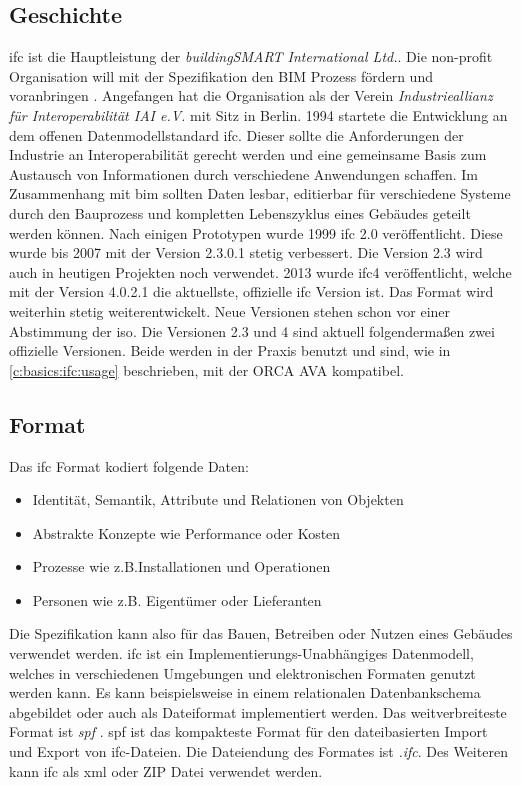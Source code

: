 \subsection{Geschichte}
\label{c:basics:ifc:history}
\ac{ifc} ist die Hauptleistung der \textit{buildingSMART International Ltd.}. Die non-profit Organisation will mit der Spezifikation den BIM Prozess fördern und voranbringen \citep[vgl.][]{BuildingSMART_IFC}.
Angefangen hat die Organisation als der Verein \textit{Industrieallianz für Interoperabilität IAI e.V.} mit Sitz in Berlin. 1994 startete die Entwicklung an dem offenen Datenmodellstandard \ac{ifc}. Dieser sollte die Anforderungen der Industrie an Interoperabilität gerecht werden und eine gemeinsame Basis zum Austausch von Informationen durch verschiedene Anwendungen schaffen. Im Zusammenhang mit \ac{bim} sollten Daten lesbar, editierbar für verschiedene Systeme durch den Bauprozess und kompletten Lebenszyklus eines Gebäudes geteilt werden können. \citep[vgl.][]{Laakso2012-oi} Nach einigen Prototypen wurde 1999 \ac{ifc} 2.0 veröffentlicht. Diese wurde bis 2007 mit der Version 2.3.0.1 stetig verbessert. Die Version 2.3 wird auch in heutigen Projekten noch verwendet. 2013 wurde \ac{ifc}4 veröffentlicht, welche mit der Version 4.0.2.1 die aktuellste, offizielle \ac{ifc} Version ist. Das Format wird weiterhin stetig weiterentwickelt. Neue Versionen stehen schon vor einer Abstimmung der \ac{iso}. \citep[vgl.][]{BuildingSMART_history_2022} Die Versionen 2.3 und 4 sind aktuell folgendermaßen zwei offizielle Versionen. Beide werden in der Praxis benutzt und sind, wie in \autoref{c:basics:ifc:usage} beschrieben, mit der ORCA AVA kompatibel.


\subsection{Format}
\label{c:basics:ifc:format}
Das \ac{ifc} Format kodiert folgende Daten:
\begin{itemize}
	\item Identität, Semantik, Attribute und Relationen von Objekten
	\item Abstrakte Konzepte wie Performance oder Kosten
	\item Prozesse wie z.B.Installationen und Operationen
	\item Personen wie z.B. Eigentümer oder Lieferanten
\end{itemize}
Die Spezifikation kann also für das Bauen, Betreiben oder Nutzen eines Gebäudes verwendet werden. \ac{ifc} ist ein Implementierungs-Unabhängiges Datenmodell, welches in verschiedenen Umgebungen und elektronischen Formaten genutzt werden kann. Es kann beispielsweise in einem relationalen Datenbankschema abgebildet oder auch als Dateiformat implementiert werden. Das weitverbreiteste Format ist \textit{\ac{spf}} \citep[vgl.][]{Laakso2012-oi,BuildingSMART_IFC}. \ac{spf} ist das kompakteste Format für den dateibasierten Import und Export von \ac{ifc}-Dateien. Die Dateiendung des Formates ist \glqq \textit{.ifc}\grqq{}. Des Weiteren kann \ac{ifc} als \ac{xml} oder ZIP Datei verwendet werden. \citep[vgl.][]{BuildingSMART_IFC}

